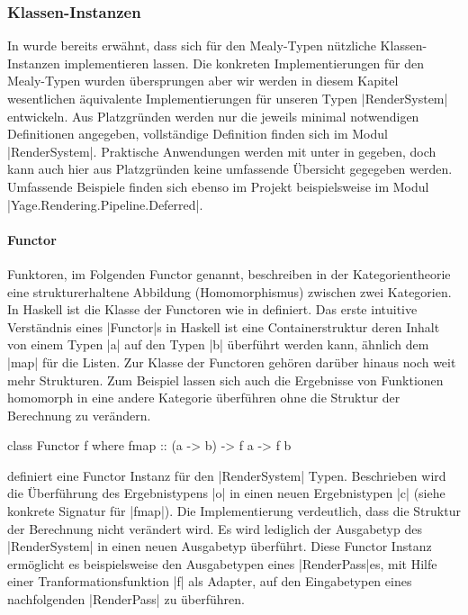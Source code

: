 \subsubsection{Klassen-Instanzen}
\label{sec:rendersystem-klassen-instanzen}

In  wurde bereits erwähnt, dass sich für den Mealy-Typen nützliche Klassen-Instanzen implementieren lassen. Die konkreten Implementierungen für den Mealy-Typen wurden übersprungen aber wir werden in diesem Kapitel wesentlichen äquivalente Implementierungen für unseren Typen |RenderSystem| entwickeln. Aus Platzgründen werden nur die jeweils minimal notwendigen Definitionen angegeben, vollständige Definition finden sich im Modul |RenderSystem|. Praktische Anwendungen werden mit unter in  gegeben, doch kann auch hier aus Platzgründen keine umfassende Übersicht gegegeben werden. Umfassende Beispiele finden sich ebenso im Projekt beispielsweise im Modul |Yage.Rendering.Pipeline.Deferred|.

\paragraph{Functor} 
Funktoren, im Folgenden Functor genannt, beschreiben in der Kategorientheorie eine strukturerhaltene Abbildung (Homomorphismus) zwischen zwei Kategorien. In Haskell ist die Klasse der Functoren wie in  definiert. Das erste intuitive Verständnis eines |Functor|s in Haskell ist eine Containerstruktur deren Inhalt von einem Typen |a| auf den Typen |b| überführt werden kann, ähnlich dem |map| für die Listen. Zur Klasse der Functoren gehören darüber hinaus noch weit mehr Strukturen. Zum Beispiel lassen sich auch die Ergebnisse von Funktionen homomorph in eine andere Kategorie überführen ohne die Struktur der Berechnung zu verändern.

\begin{haskell}[label={lst:class-functor},caption={Functor Klasse\protect\footnotemark},nolol,float,floatplacement=H]
class Functor f where
  fmap :: (a -> b) -> f a -> f b 
\end{haskell}

 definiert eine Functor Instanz für den |RenderSystem| Typen. Beschrieben wird die Überführung des Ergebnistypens |o| in einen neuen Ergebnistypen |c| (siehe konkrete Signatur für |fmap|). Die Implementierung verdeutlich, dass die Struktur der Berechnung nicht verändert wird. Es wird lediglich der Ausgabetyp des |RenderSystem| in einen neuen Ausgabetyp überführt. Diese Functor Instanz ermöglicht es beispielsweise den Ausgabetypen eines |RenderPass|es, mit Hilfe einer Tranformationsfunktion |f| als Adapter, auf den Eingabetypen eines nachfolgenden |RenderPass| zu überführen.

